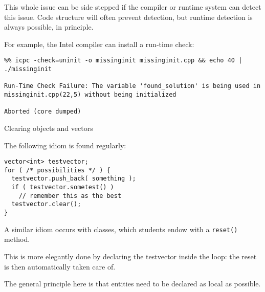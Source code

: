 This whole issue can be side stepped if the compiler or runtime system
can detect this issue.
Code structure will often prevent detection, 
but runtime detection is always possible, in principle.

For example, the Intel compiler can install a run-time check:

\begin{verbatim}
%% icpc -check=uninit -o missinginit missinginit.cpp && echo 40 | ./missinginit

Run-Time Check Failure: The variable 'found_solution' is being used in missinginit.cpp(22,5) without being initialized

Aborted (core dumped)
\end{verbatim}

 {Clearing objects and vectors}
\label{teach:clear}

The following idiom is found regularly:
\begin{lstlisting}
vector<int> testvector;
for ( /* possibilities */ ) {
  testvector.push_back( something );
  if ( testvector.sometest() ) 
    // remember this as the best
  testvector.clear();
}
\end{lstlisting}
A similar idiom occurs with classes,
which students endow with a \lstinline+reset()+ method.

This is more elegantly done by declaring the testvector inside the loop:
the reset is then automatically taken care of.

The general principle here is that entities need to be declared as
local as possible.
